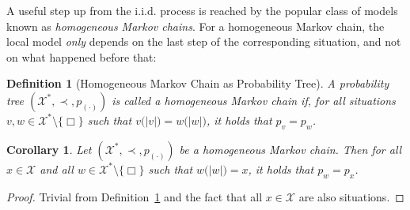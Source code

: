 \documentclass[11pt]{book}
\newtheorem{corollary}[theorem]{Corollary}
\newtheorem{definition}{Definition}
\newcommand{\states}{\mathcal{X}}
\begin{document}
A useful step up from the i.i.d. process is reached by the popular class of models known as \emph{homogeneous Markov chains}. For a homogeneous Markov chain, the local model \emph{only} depends on the last step of the corresponding situation, and not on what happened before that:
\begin{definition}[Homogeneous Markov Chain as Probability Tree]\label{def:prob_tree_homogen_markov}
A probability tree $(\states^*,\prec,p_{(\cdot)})$ is called a homogeneous Markov chain if, for all situations $v,w\in\states^*\setminus\{\Box\}$ such that $v\bigl(\lvert v\rvert\bigr)=w\bigl(\lvert w\rvert\bigr)$, it holds that $p_v=p_w$.
\end{definition} 
\begin{corollary}
Let $(\states^*,\prec,p_{(\cdot)})$ be a homogeneous Markov chain. Then for all $x\in\states$ and all $w\in\states^*\setminus\{\Box\}$ such that $w\bigl(\lvert w\rvert\bigr)=x$, it holds that $p_w=p_x$.
\end{corollary}
\begin{proof}
Trivial from Definition~\ref{def:prob_tree_homogen_markov} and the fact that all $x\in\states$ are also situations. 
\end{proof}
\end{document}
